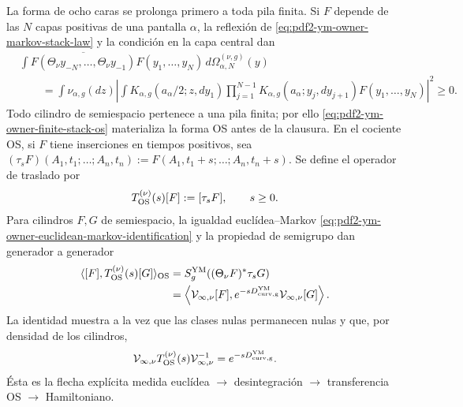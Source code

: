 La forma de ocho caras se prolonga primero a toda pila finita. Si $F$ depende de
las $N$ capas positivas de una pantalla $\alpha$, la reflexión de
\eqref{eq:pdf2-ym-owner-markov-stack-law} y la condición en la capa central dan
\begin{equation}\label{eq:pdf2-ym-owner-finite-stack-os}
 \begin{aligned}
 &\int \overline{F(\Theta_\nu y_{-N},\ldots,
                         \Theta_\nu y_{-1})}
          F(y_1,\ldots,y_N)\,d\Omega_{\alpha,N}^{(\nu,g)}(y)\\
 &\qquad=
 \int\nu_{\alpha,g}(dz)\left|
  \int K_{\alpha,g}(a_\alpha/2;z,dy_1)
       \prod_{j=1}^{N-1}K_{\alpha,g}(a_\alpha;y_j,dy_{j+1})
       F(y_1,\ldots,y_N)
 \right|^2\ge0.
 \end{aligned}
\end{equation}
Todo cilindro de semiespacio pertenece a una pila finita; por ello
\eqref{eq:pdf2-ym-owner-finite-stack-os} materializa la forma OS antes de la
clausura. En el cociente OS, si $F$ tiene inserciones en tiempos positivos, sea
$(\tau_sF)(A_1,t_1;\ldots;A_n,t_n):=
F(A_1,t_1+s;\ldots;A_n,t_n+s)$. Se define el operador de traslado por
\begin{equation}\label{eq:pdf2-ym-owner-os-transfer-operator}
 T_{\rm OS}^{(\nu)}(s)[F]:=[\tau_sF],
 \qquad s\ge0.
\end{equation}
Para cilindros $F,G$ de semiespacio, la igualdad euclídea--Markov
\eqref{eq:pdf2-ym-owner-euclidean-markov-identification} y la propiedad de
semigrupo dan generador a generador
\begin{equation}\label{eq:pdf2-ym-owner-os-markov-intertwining}
 \begin{aligned}
 \langle[F],T_{\rm OS}^{(\nu)}(s)[G]\rangle_{\rm OS}
 &=S_g^{\rm YM}((\Theta_\nu F)^*\tau_sG)\\
 &=\left\langle
    \mathcal V_{\infty,\nu}[F],
    e^{-sD_{\rm curv,g}^{\rm YM}}
    \mathcal V_{\infty,\nu}[G]
   \right\rangle .
 \end{aligned}
\end{equation}
La identidad muestra a la vez que las clases nulas permanecen nulas y que,
por densidad de los cilindros,
\begin{equation}\label{eq:pdf2-ym-owner-os-generator-identification}
 \mathcal V_{\infty,\nu}T_{\rm OS}^{(\nu)}(s)
 \mathcal V_{\infty,\nu}^{-1}
 =e^{-sD_{\rm curv,g}^{\rm YM}}.
\end{equation}
Ésta es la flecha explícita medida euclídea $\to$ desintegración $\to$
transferencia OS $\to$ Hamiltoniano.

